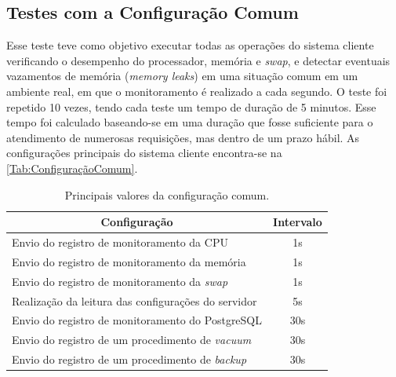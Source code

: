 \subsection{Testes com a Configuração Comum} \label{subsec:QuantidadeRequisicoesNormais}

Esse teste teve como objetivo executar todas as operações do sistema cliente verificando o desempenho do processador, memória e \textit{swap}, e detectar eventuais vazamentos de memória (\textit{memory leaks}) em uma situação comum em um ambiente real, em que o monitoramento é realizado a cada segundo. O teste foi repetido 10 vezes, tendo cada teste um tempo de duração de 5 minutos. Esse tempo foi calculado baseando-se em uma duração que fosse suficiente para o atendimento de numerosas requisições, mas dentro de um prazo hábil. As configurações principais do sistema cliente encontra-se na \autoref{Tab:ConfiguraçãoComum}.


\begin{table}[H]
\centering
\label{my-label}
\begin{tabular}{|l|c|}
\hline
\multicolumn{1}{|c|}{{\color[HTML]{000000} \textbf{Configuração}}} & {\color[HTML]{000000} \textbf{Intervalo}} \\ \hline
Envio do registro de monitoramento da CPU                 & 1s                                                                        \\ \hline
Envio do registro de monitoramento da memória             & 1s                                                                        \\ \hline
Envio do registro de monitoramento da \textit{swap}                & 1s                                                                        \\ \hline
Realização da leitura das configurações do servidor       & 5s                                                                       \\ \hline
Envio do registro de monitoramento do PostgreSQL          & 30s                                                                       \\ \hline
Envio do registro de um procedimento de \textit{vacuum}   & 30s                                                                       \\ \hline
Envio do registro de um procedimento de \textit{backup}   & 30s                                                                       \\ \hline
\end{tabular}
\caption[Principais valores da configuração Comum.]{Principais valores da configuração comum.}
\label{Tab:ConfiguraçãoComum}
\end{table}

